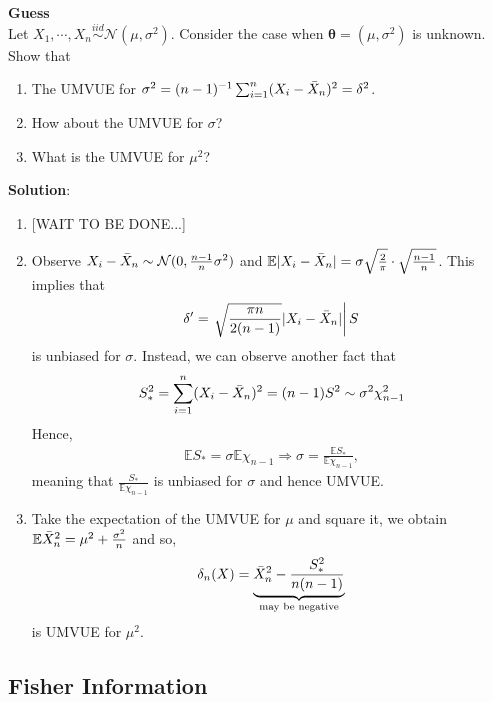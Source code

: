 \begin{example}
    \textbf{Guess}\\
    Let $X_1,\cdots,X_n\overset{iid}{\sim}\mathcal{N}(\mu,\sigma^2)$. 
    Consider the case when $\boldsymbol{\theta}=(\mu,\sigma^2)$ is unknown.
    Show that
    \begin{enumerate}[{(i)}]
        \item The UMVUE for $\sigma^2=(n-1)^{-1}\sum_{i=1}^n(X_i-\Bar{X}_n)^2=\delta^2$.
        \item How about the UMVUE for $\sigma$?
        \item What is the UMVUE for $\mu^2$?
    \end{enumerate}

    \textbf{Solution}:
    \begin{enumerate}[{(i)}]
        \item {\color{red}[WAIT TO BE DONE...]}
        \item Observe $X_i-\Bar{X}_n\sim \mathcal{N}(0,\frac{n-1}{n}\sigma^2)$ and 
        $\mathbb{E}|X_i-\Bar{X}_n|=\sigma\sqrt{\frac{2}{\pi}}\cdot\sqrt{\frac{n-1}{n}}$.
        This implies that 
        \begin{gather}
            \delta'=\left.\sqrt{\frac{\pi n}{2(n-1)}}|X_i-\Bar{X}_n|\right|S
        \end{gather}
        is unbiased for $\sigma$. Instead, we can observe another fact that 
        \begin{gather}
            S_*^2=\sum_{i=1}^n(X_i-\Bar{X}_n)^2=(n-1)S^2 \sim \sigma^2\chi^2_{n-1}
        \end{gather}
        Hence,
        \begin{gather}
            \mathbb{E}S_*=\sigma\mathbb{E}\chi_{n-1}\Rightarrow\sigma=\frac{\mathbb{E}S_*}{\mathbb{E}\chi_{n-1}},
        \end{gather}
        meaning that $\frac{S_*}{\mathbb{E}\chi_{n-1}}$ is unbiased for $\sigma$ and hence UMVUE.
        \item Take the expectation of the UMVUE for $\mu$ and square it,
        we obtain $\mathbb{E}\Bar{X}_n^2=\mu^2+\frac{\sigma^2}{n}$ and so, 
        \begin{gather}
            \delta_n(X)=\underbrace{\Bar{X}_n^2-\frac{S_*^2}{n(n-1)}}_{\text{may be negative}}
        \end{gather}
        is UMVUE for $\mu^2$.
    \end{enumerate}
\end{example}

\subsection{Fisher Information}

